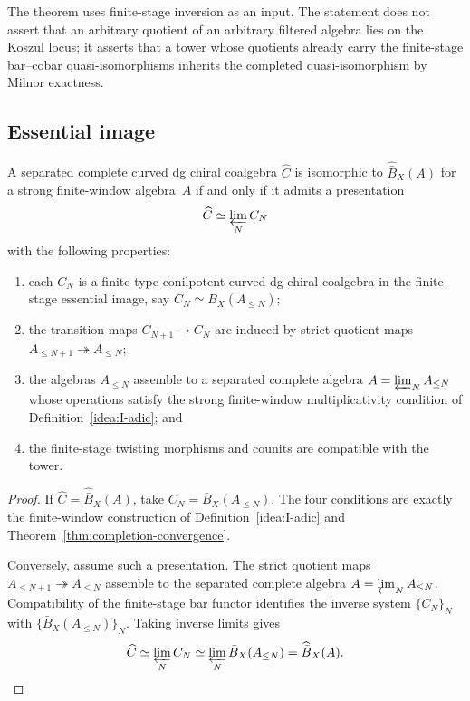 \begin{remark}\label{rem:completed-bar-cobar-window}
The theorem uses finite-stage inversion as an input.  The statement
does not assert that an arbitrary quotient of an arbitrary filtered
algebra lies on the Koszul locus; it asserts that a tower whose
quotients already carry the finite-stage bar--cobar quasi-isomorphisms
inherits the completed quasi-isomorphism by Milnor exactness.
\end{remark}

\subsection{Essential image}

\begin{theorem}\label{thm:koszul-dual-characterization}
A separated complete curved dg chiral coalgebra
$\widehat C$ is isomorphic to $\widehat{\bar B}_X(A)$ for a strong
finite-window algebra~$A$ if and only if it admits a presentation
\[
\widehat C\simeq\varprojlim_N C_N
\]
with the following properties:
\begin{enumerate}
\item each $C_N$ is a finite-type conilpotent curved dg chiral
 coalgebra in the finite-stage essential image, say
 $C_N\simeq\bar B_X(A_{\le N})$;
\item the transition maps $C_{N+1}\to C_N$ are induced by strict
 quotient maps $A_{\le N+1}\twoheadrightarrow A_{\le N}$;
\item the algebras $A_{\le N}$ assemble to a separated complete
algebra $A=\varprojlim_NA_{\le N}$ whose operations satisfy the
 strong finite-window multiplicativity condition of
 Definition~\ref{idea:I-adic}; and
\item the finite-stage twisting morphisms and counits are compatible
 with the tower.
\end{enumerate}
\end{theorem}

\begin{proof}
If $\widehat C=\widehat{\bar B}_X(A)$, take
$C_N=\bar B_X(A_{\le N})$.  The four conditions are exactly the
finite-window construction of Definition~\ref{idea:I-adic} and
Theorem~\ref{thm:completion-convergence}.

Conversely, assume such a presentation.  The strict quotient maps
$A_{\le N+1}\twoheadrightarrow A_{\le N}$ assemble to the separated
complete algebra $A=\varprojlim_NA_{\le N}$.  Compatibility of the
finite-stage bar functor identifies the inverse system
$\{C_N\}_N$ with $\{\bar B_X(A_{\le N})\}_N$.  Taking inverse limits
gives
\[
\widehat C
\simeq
\varprojlim_N C_N
\simeq
\varprojlim_N\bar B_X(A_{\le N})
=
\widehat{\bar B}_X(A).
\]
\end{proof}

